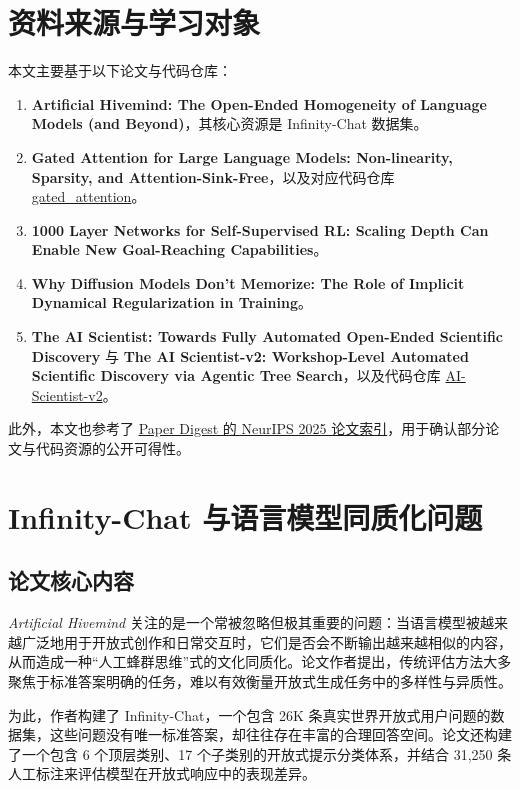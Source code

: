 \documentclass[UTF8,11pt]{ctexart}
\begin{document}
\section{资料来源与学习对象}
本文主要基于以下论文与代码仓库：
\begin{enumerate}[leftmargin=2em]
  \item \textbf{Artificial Hivemind: The Open-Ended Homogeneity of Language Models (and Beyond)}，其核心资源是 Infinity-Chat 数据集。
  \item \textbf{Gated Attention for Large Language Models: Non-linearity, Sparsity, and Attention-Sink-Free}，以及对应代码仓库 \href{https://github.com/qiuzh20/gated_attention}{gated\_attention}。
  \item \textbf{1000 Layer Networks for Self-Supervised RL: Scaling Depth Can Enable New Goal-Reaching Capabilities}。
  \item \textbf{Why Diffusion Models Don't Memorize: The Role of Implicit Dynamical Regularization in Training}。
  \item \textbf{The AI Scientist: Towards Fully Automated Open-Ended Scientific Discovery} 与 \textbf{The AI Scientist-v2: Workshop-Level Automated Scientific Discovery via Agentic Tree Search}，以及代码仓库 \href{https://github.com/SakanaAI/AI-Scientist-v2}{AI-Scientist-v2}。
\end{enumerate}

此外，本文也参考了 \href{https://www.paperdigest.org/2025/11/neurips-2025-papers-with-code-data/}{Paper Digest 的 NeurIPS 2025 论文索引}，用于确认部分论文与代码资源的公开可得性。

\section{Infinity-Chat 与语言模型同质化问题}
\subsection{论文核心内容}
\emph{Artificial Hivemind} 关注的是一个常被忽略但极其重要的问题：当语言模型被越来越广泛地用于开放式创作和日常交互时，它们是否会不断输出越来越相似的内容，从而造成一种“人工蜂群思维”式的文化同质化。论文作者提出，传统评估方法大多聚焦于标准答案明确的任务，难以有效衡量开放式生成任务中的多样性与异质性。

为此，作者构建了 Infinity-Chat，一个包含 26K 条真实世界开放式用户问题的数据集，这些问题没有唯一标准答案，却往往存在丰富的合理回答空间。论文还构建了一个包含 6 个顶层类别、17 个子类别的开放式提示分类体系，并结合 31,250 条人工标注来评估模型在开放式响应中的表现差异。
\end{document}
